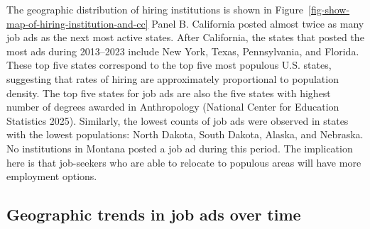 \documentclass[
  12pt,
]{article}
\begin{document}
The geographic distribution of hiring institutions is shown in
Figure~\ref{fig-show-map-of-hiring-institution-and-cc} Panel B.
California posted almost twice as many job ads as the next most active
states. After California, the states that posted the most ads during
2013--2023 include New York, Texas, Pennsylvania, and Florida. These top
five states correspond to the top five most populous U.S. states,
suggesting that rates of hiring are approximately proportional to
population density. The top five states for job ads are also the five
states with highest number of degrees awarded in Anthropology (National
Center for Education Statistics 2025). Similarly, the lowest counts of
job ads were observed in states with the lowest populations: North
Dakota, South Dakota, Alaska, and Nebraska. No institutions in Montana
posted a job ad during this period. The implication here is that
job-seekers who are able to relocate to populous areas will have more
employment options.

\subsection{Geographic trends in job ads over
time}\label{geographic-trends-in-job-ads-over-time}
\end{document}

